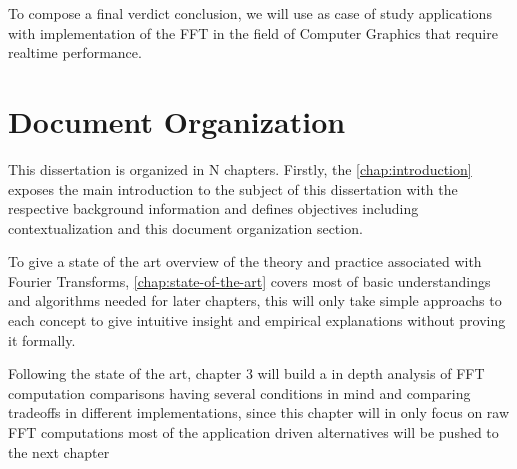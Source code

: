 \documentclass[
  oneside,
  11pt, a4paper,
  footinclude=true,
  headinclude=true,
  cleardoublepage=empty
]{scrbook}
\begin{document}
To compose a final verdict conclusion, we will use as case of study applications with implementation of the FFT in the field of Computer Graphics that require realtime performance.







\section{Document Organization} \label{sec:document-organization}

This dissertation is organized in N chapters. Firstly, the \autoref{chap:introduction} exposes the main introduction to the subject of this dissertation with the respective background information and defines objectives including contextualization and this document organization section.

To give a state of the art overview of the theory and practice associated with Fourier Transforms, \autoref{chap:state-of-the-art} covers most of basic understandings and algorithms needed for later chapters, this will only take simple approachs to each concept to give intuitive insight and empirical explanations without proving it formally.

Following the state of the art, chapter 3 will build a in depth analysis of FFT computation comparisons having several conditions in mind and comparing tradeoffs in different implementations, since this chapter will in only focus on raw FFT computations most of the application driven alternatives will be pushed to the next chapter
\end{document}
